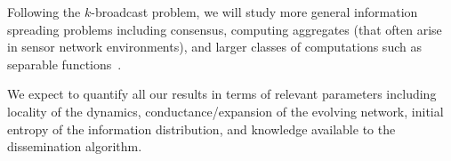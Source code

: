 Following the $k$-broadcast problem, we will study more general
information spreading problems including consensus, computing
aggregates (that often arise in sensor network environments), and
larger classes of computations such as separable
functions~\cite{mosk-aoyama+s:separable}.


We expect to quantify all our results in terms of relevant parameters
including locality of the dynamics, conductance/expansion of the
evolving network, initial entropy of the information distribution, and
knowledge available to the dissemination algorithm.  

\iffalse*****
Repeats last para We have also shown that the dissemination problem
can be reduced to the problem of packing Steiner trees in directed
graphs, and thus has deep connections with the long-standing open
problems of approximating directed Steiner
trees~\cite{charikar+ccdgg:steiner} and bounding the network coding
advantage in multicast over directed networks.  \fi

